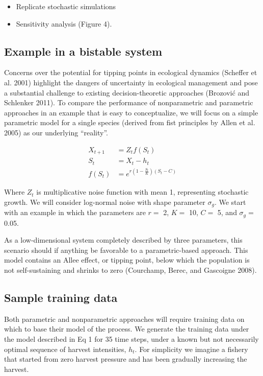 \documentclass[author-year, review]{elsarticle} %
\begin{document}
\begin{itemize}
\itemsep1pt\parskip0pt
\item
  Replicate stochastic simulations
\item
  Sensitivity analysis (Figure 4).
\end{itemize}

\subsection{Example in a bistable system}

Concerns over the potential for tipping points in ecological dynamics
(Scheffer et al. 2001) highlight the dangers of uncertainty in
ecological management and pose a substantial challenge to existing
decision-theoretic approaches (Brozović and Schlenker 2011). To compare
the performance of nonparametric and parametric approaches in an example
that is easy to conceptualize, we will focus on a simple parametric
model for a single species (derived from fist principles by Allen et al.
2005) as our underlying ``reality''.

\begin{align}
X_{t+1} &= Z_t f(S_t) \\
S_t &= X_t - h_t \\
f(S_t) &= e^{r \left(1 - \frac{S_t}{K}\right)\left(S_t - C\right)}
\end{align}

Where $Z_t$ is multiplicative noise function with mean 1, representing
stochastic growth. We will consider log-normal noise with shape
parameter $\sigma_g$. We start with an example in which the parameters
are $r =$ 2, $K =$ 10, $C =$ 5, and $\sigma_g =$ 0.05.

As a low-dimensional system completely described by three parameters,
this scenario should if anything be favorable to a parametric-based
approach. This model contains an Allee effect, or tipping point, below
which the population is not self-sustaining and shrinks to zero
(Courchamp, Berec, and Gascoigne 2008).

\subsection{Sample training data}

Both parametric and nonparametric approaches will require training data
on which to base their model of the process. We generate the training
data under the model described in Eq 1 for 35 time steps, under a known
but not necessarily optimal sequence of harvest intensities, $h_t$. For
simplicity we imagine a fishery that started from zero harvest pressure
and has been gradually increasing the harvest.
\end{document}
